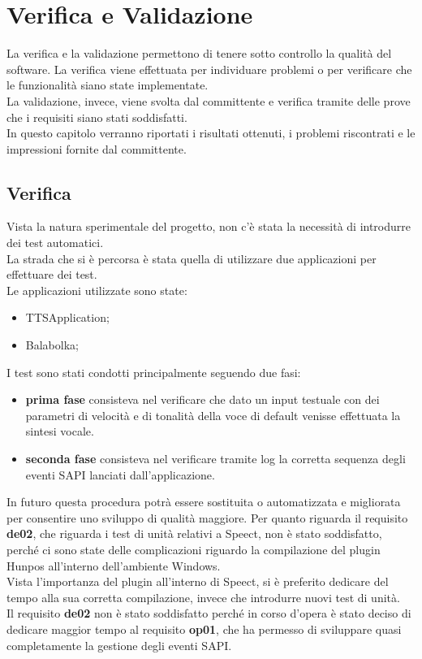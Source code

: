 \chapter{Verifica e Validazione}
La verifica e la validazione permettono di tenere sotto controllo la qualità del software.
La verifica viene effettuata per individuare problemi o per verificare che le funzionalità siano state implementate.\\
La validazione, invece, viene svolta dal committente e verifica tramite delle prove che i requisiti siano stati soddisfatti.\\
In questo capitolo verranno riportati i risultati ottenuti, i problemi riscontrati e le impressioni fornite dal committente. 
\thispagestyle{empty}

\newpage
\section{Verifica}
Vista la natura sperimentale del progetto, non c'è stata la necessità di introdurre dei test automatici.\\
La strada che si è percorsa è stata quella di utilizzare due applicazioni per effettuare dei test.\\
Le applicazioni utilizzate sono state:
\begin{itemize}
	\item TTSApplication;
	\item Balabolka;
\end{itemize}
I test sono stati condotti principalmente seguendo due fasi:
\begin{itemize}
	\item \textbf{prima fase} consisteva nel verificare che dato un input testuale con dei parametri di velocità e di tonalità della voce di default venisse effettuata la sintesi vocale.
	\item \textbf{seconda fase} consisteva nel verificare tramite log la corretta sequenza degli eventi SAPI lanciati dall'applicazione.
\end{itemize}
In futuro questa procedura potrà essere sostituita o automatizzata e migliorata per consentire uno sviluppo di qualità maggiore.
Per quanto riguarda il requisito \textbf{de02}, che riguarda i test di unità relativi a Speect, non è stato soddisfatto, perché ci sono state delle complicazioni riguardo la compilazione del plugin Hunpos all'interno dell'ambiente Windows.\\
Vista l'importanza del plugin all'interno di Speect, si è preferito dedicare del tempo alla sua corretta compilazione, invece che introdurre nuovi test di unità.\\
Il requisito \textbf{de02} non è stato soddisfatto perché in corso d'opera è stato deciso di dedicare maggior tempo al requisito \textbf{op01}, che ha permesso di sviluppare quasi completamente la gestione degli eventi SAPI.
